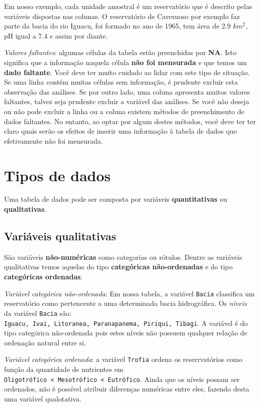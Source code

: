 \documentclass[
]{book}
\begin{document}
Em nosso exemplo, cada unidade amostral é um reservatório que é descrito pelas variáveis dispostas nas colunas. O reservatório de Cavernoso por exemplo faz parte da bacia do rio Iguacu, foi formado no ano de 1965, tem área de 2.9 \(km^2\), pH igual a 7.4 e assim por diante.

\emph{Valores faltantes}: algumas células da tabela estão preenchidas por \textbf{NA}. Isto significa que a informação naquela célula \textbf{não foi mensurada} e que temos um \textbf{dado faltante}. Você deve ter muito cuidado ao lidar com este tipo de situação. Se uma linha contém muitas células sem informação, é prudente excluir esta observação das análises. Se por outro lado, uma coluna apresenta muitos valores faltantes, talvez seja prudente excluir a variável das análises. Se você não deseja ou não pode excluir a linha ou a coluna existem métodos de preenchimento de dados faltantes. No entanto, ao optar por algum destes métodos, você deve ter ter claro quais serão os efeitos de inserir uma informação à tabela de dados que efetivamente não foi mensurada.

\hypertarget{tipos-de-dados}{%
\section{Tipos de dados}\label{tipos-de-dados}}

Uma tabela de dados pode ser composta por variáveis \textbf{quantitativas} ou \textbf{qualitativas}.

\hypertarget{variuxe1veis-qualitativas}{%
\subsection{Variáveis qualitativas}\label{variuxe1veis-qualitativas}}

São variáveis \textbf{não-numéricas} como categorias ou rótulos. Dentre as variáveis qualitativas temos aquelas do tipo \textbf{categóricas não-ordenadas} e do tipo \textbf{categóricas ordenadas}.

\emph{Variável categórica não-ordenada}: Em nossa tabela, a variável \texttt{Bacia} classifica um reservatório como pertencente a uma determinada bacia hidrográfica. Os \emph{níveis} da variável \texttt{Bacia} são: \texttt{Iguacu,\ Ivai,\ Litoranea,\ Paranapanema,\ Piriqui,\ Tibagi}. A variável é do tipo categórica não-ordenada pois estes níveis não possuem qualquer relação de ordenação natural entre si.

\emph{Variável categórica ordenada}: a variável \texttt{Trofia} ordena os reserrvatórios como função da quantidade de nutrientes em \texttt{Oligotrófico\ \textless{}\ Mesotrófico\ \textless{}\ Eutrófico}. Ainda que os níveis possam ser ordenados, não é possível atribuir diferenças numéricas entre eles, fazendo desta uma variável qualotativa.
\end{document}
